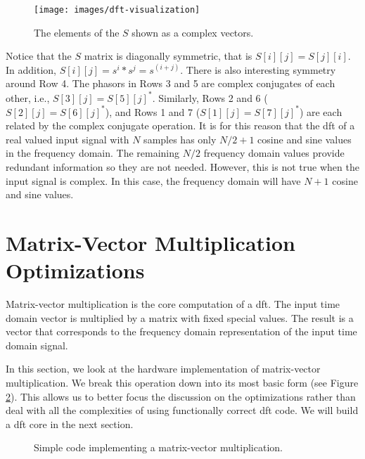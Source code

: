 \begin{figure}
\centering
\texttt{[image: images/dft-visualization]}
\caption{ The elements of the $S$ shown as a complex vectors.  }
\label{fig:dft_visualization}
\end{figure}

Notice that the $S$ matrix is diagonally symmetric, that is $S[i][j] = S[j][i]$.  In addition, $S[i][j] = s^i*s^j = s^{(i+j)}$.  There is also interesting symmetry around Row 4. The phasors in Rows 3 and 5 are complex conjugates of each other, i.e., $S[3][j] = S[5][j]^*$. Similarly, Rows 2 and 6 ($S[2][j] = S[6][j]^*$), and Rows 1 and 7 ($S[1][j] = S[7][j]^*$) are each related by the complex conjugate operation. It is for this reason that the \gls{dft} of a real valued input signal with $N$ samples has only $N/2 + 1$ cosine and sine values in the frequency domain. The remaining $N/2$ frequency domain values provide redundant information so they are not needed. However, this is not true when the input signal is complex. In this case, the frequency domain will have $N + 1$ cosine and sine values. 

\section{Matrix-Vector Multiplication Optimizations}
\label{subsec:mvmul_implementation}

Matrix-vector multiplication is the core computation of a \gls{dft}.  The input time domain vector is multiplied by a matrix with fixed special values. The result is a vector that corresponds to the frequency domain representation of the input time domain signal.  

In this section, we look at the hardware implementation of matrix-vector multiplication. We break this operation down into its most basic form (see Figure \ref{fig:matrix_vector_base}). This allows us to better focus the discussion on the optimizations rather than deal with all the complexities of using functionally correct \gls{dft} code. We will build a \gls{dft} core in the next section. 

\begin{figure}
\begin{footnotesize}

\end{footnotesize}
\caption{Simple code implementing a matrix-vector multiplication.}\label{fig:matrix_vector_base}
\end{figure}

